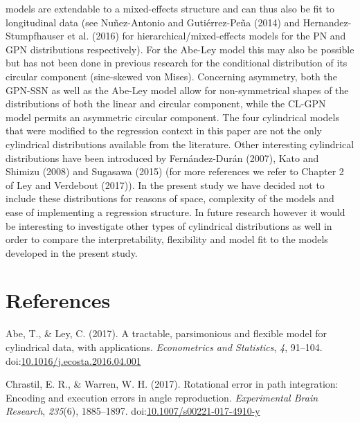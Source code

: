 \documentclass[man,mask]{apa6}
\DeclareRobustCommand{\VANDER}[3]{#2}
\DeclareRobustCommand{\VAN}[3]{#2}
\DeclareRobustCommand{\DEN}[3]{#2}
\begin{document}
models are extendable to a mixed-effects structure and can thus also be fit to
longitudinal data (see Nuñez-Antonio and Gutiérrez-Peña (2014) and Hernandez-Stumpfhauser et al. (2016) for
hierarchical/mixed-effects models for the PN and GPN distributions
respectively). For the Abe-Ley model this may also be possible but has not been
done in previous research for the conditional distribution of its circular
component (sine-skewed von Mises). Concerning asymmetry, both the GPN-SSN as
well as the Abe-Ley model allow for non-symmetrical shapes of the distributions
of both the linear and circular component, while the CL-GPN model permits an
asymmetric circular component.\newline
\indent The four cylindrical models that were modified to the regression
context in this paper are not the only cylindrical distributions
available from the literature. Other interesting cylindrical distributions have been introduced by
Fernández-Durán (2007), Kato and Shimizu (2008) and Sugasawa (2015) (for more references we
refer to Chapter 2 of Ley and Verdebout (2017)). In the present study we
have decided not to include these distributions for reasons of space,
complexity of the models and ease of implementing a regression
structure. In future research however it would be interesting to
investigate other types of cylindrical distributions as well in order to
compare the interpretability, flexibility and model fit to the models
developed in the present study.


\DeclareRobustCommand{\VANDER}[3]{#3} 
\DeclareRobustCommand{\VAN}[3]{#3}
\DeclareRobustCommand{\DEN}[3]{#3}

\setlength{\parindent}{-0.5in}
\setlength{\leftskip}{0.5in}
\setlength{\parskip}{8pt}

\newpage
\section*{{\normalfont References}}

\hypertarget{refs}{}
\leavevmode\hypertarget{ref-abe2017tractable}{}%
Abe, T., \& Ley, C. (2017). A tractable, parsimonious and flexible model for cylindrical data, with applications. \emph{Econometrics and Statistics}, \emph{4}, 91--104. doi:\href{https://doi.org/10.1016/j.ecosta.2016.04.001}{10.1016/j.ecosta.2016.04.001}

\leavevmode\hypertarget{ref-chrastil2017rotational}{}%
Chrastil, E. R., \& Warren, W. H. (2017). Rotational error in path integration: Encoding and execution errors in angle reproduction. \emph{Experimental Brain Research}, \emph{235}(6), 1885--1897. doi:\href{https://doi.org/10.1007/s00221-017-4910-y}{10.1007/s00221-017-4910-y}
\end{document}
